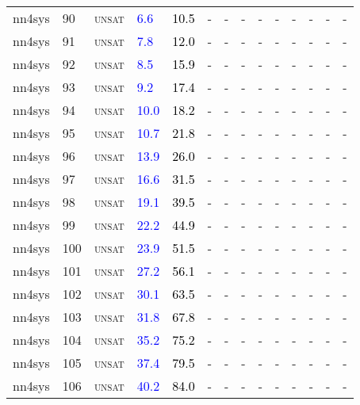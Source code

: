 \begin{center}
{\begin{longtable}{@{}llllllllllllll@{}}
nn4sys & 90 & \textsc{unsat} & \textcolor{blue}{6.6} & \textcolor{black}{10.5} & - & - & - & - & - & - & - & - & - \\
nn4sys & 91 & \textsc{unsat} & \textcolor{blue}{7.8} & \textcolor{black}{12.0} & - & - & - & - & - & - & - & - & - \\
nn4sys & 92 & \textsc{unsat} & \textcolor{blue}{8.5} & \textcolor{black}{15.9} & - & - & - & - & - & - & - & - & - \\
nn4sys & 93 & \textsc{unsat} & \textcolor{blue}{9.2} & \textcolor{black}{17.4} & - & - & - & - & - & - & - & - & - \\
nn4sys & 94 & \textsc{unsat} & \textcolor{blue}{10.0} & \textcolor{black}{18.2} & - & - & - & - & - & - & - & - & - \\
nn4sys & 95 & \textsc{unsat} & \textcolor{blue}{10.7} & \textcolor{black}{21.8} & - & - & - & - & - & - & - & - & - \\
nn4sys & 96 & \textsc{unsat} & \textcolor{blue}{13.9} & \textcolor{black}{26.0} & - & - & - & - & - & - & - & - & - \\
nn4sys & 97 & \textsc{unsat} & \textcolor{blue}{16.6} & \textcolor{black}{31.5} & - & - & - & - & - & - & - & - & - \\
nn4sys & 98 & \textsc{unsat} & \textcolor{blue}{19.1} & \textcolor{black}{39.5} & - & - & - & - & - & - & - & - & - \\
nn4sys & 99 & \textsc{unsat} & \textcolor{blue}{22.2} & \textcolor{black}{44.9} & - & - & - & - & - & - & - & - & - \\
nn4sys & 100 & \textsc{unsat} & \textcolor{blue}{23.9} & \textcolor{black}{51.5} & - & - & - & - & - & - & - & - & - \\
nn4sys & 101 & \textsc{unsat} & \textcolor{blue}{27.2} & \textcolor{black}{56.1} & - & - & - & - & - & - & - & - & - \\
nn4sys & 102 & \textsc{unsat} & \textcolor{blue}{30.1} & \textcolor{black}{63.5} & - & - & - & - & - & - & - & - & - \\
nn4sys & 103 & \textsc{unsat} & \textcolor{blue}{31.8} & \textcolor{black}{67.8} & - & - & - & - & - & - & - & - & - \\
nn4sys & 104 & \textsc{unsat} & \textcolor{blue}{35.2} & \textcolor{black}{75.2} & - & - & - & - & - & - & - & - & - \\
nn4sys & 105 & \textsc{unsat} & \textcolor{blue}{37.4} & \textcolor{black}{79.5} & - & - & - & - & - & - & - & - & - \\
nn4sys & 106 & \textsc{unsat} & \textcolor{blue}{40.2} & \textcolor{black}{84.0} & - & - & - & - & - & - & - & - & - \\

\end{longtable}}
\end{center}
